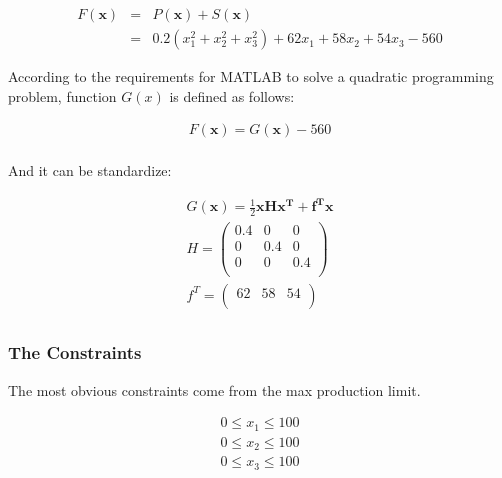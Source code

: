 \documentclass[12pt]{article}
\begin{document}
\begin{equation}
\begin{aligned}
	F(\mathbf{x}) &=& P(\mathbf{x})+S(\mathbf{x}) \\ 
	&=& 0.2(x_1^2+x_2^2+x_3^2)+62x_1+58x_2+54x_3-560
\end{aligned}
\end{equation}

According to the requirements for MATLAB to solve a quadratic programming problem, function $G(x)$ is defined as follows:

\begin{equation}
\begin{aligned}
	F(\mathbf{x})=G(\mathbf{x})-560  \\
\end{aligned}
\end{equation}

And it can be standardize:

\begin{equation}
\begin{aligned}
		G(\mathbf{x})=\frac{1}{2}\mathbf{x}\mathbf{H}\mathbf{x^T}+ \mathbf{f^T}\mathbf{x} \\
	H=\left(   
	\begin{array}{ccc} 
		0.4 & 0 & 0\\
		0 & 0.4 & 0\\ 
		0 & 0 & 0.4\\ 
	\end{array}
	\right) \\
	f^T=\left(   
	\begin{array}{ccc} 
		62 & 58 & 54\\
	\end{array}
	\right) \\
\end{aligned}
\end{equation}

\subsubsection{The Constraints}

The most obvious constraints come from the max production limit.

\begin{equation}
	\begin{aligned}
	0 \le x_1 \le 100 \\
	0 \le x_2 \le 100 \\
	0 \le x_3 \le 100 \\
	\end{aligned}
\end{equation}
\end{document}
